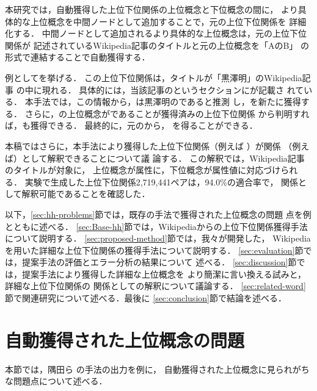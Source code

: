 \documentclass[japanese]{jnlp_1.4}
\newcommand{\xmp}[1]{}
\newcommand{\isa}[2]{}
\newcommand{\isaFour}[4]{}
\newcommand{\attval}[3]{}
\begin{document}
本研究では，自動獲得した上位下位関係の上位概念と下位概念の間に，
より具体的な上位概念を中間ノードとして追加することで，元の上位下位関係を
詳細化する．
中間ノードとして追加されるより具体的な上位概念は，元の上位下位関係が
記述されているWikipedia記事のタイトルと元の上位概念を「AのB」
の形式で連結することで自動獲得する．

例として\isa{作品}{七人の侍}を挙げる．
この上位下位関係は，タイトルが「黒澤明」のWikipedia記事
の中に現れる．
具体的には，当該記事の\xmp{作品}というセクションに\xmp{七人の侍}が記載さ
れている．
本手法では，この情報から，\xmp{七人の侍}は黒澤明の\xmp{作品}であると推測
し，\isa{黒澤明の作品}{七人の侍}を新たに獲得する．
さらに，\xmp{黒澤明}の上位概念が\xmp{映画監督}であることが獲得済みの上位下位関係
から判明すれば，\isa{映画監督の作品}{七人の侍}も獲得できる．
最終的に，元の\isa{作品}{七人の侍}から，
\isaFour{作品}{映画監督の作品}{黒澤明の作品}{七人の侍}を得ることができる．


本稿ではさらに，本手法により獲得した上位下位関係（例えば
\isa{黒澤明の作品}{七人の侍}）が\attval{対象}{属性}{属性値}関係
（例えば\attval{黒澤明}{作品}{七人の侍}）として解釈できることについて議
論する．
この解釈では，Wikipedia記事のタイトルが対象に，
上位概念が属性に，下位概念が属性値に対応づけられる．
実験で生成した上位下位関係2,719,441ペアは，94.0\%の適合率で，
\attval{対象}{属性}{属性値}関係として解釈可能であることを確認した．

以下，\ref{sec:hh-problems}節では，既存の手法で獲得された上位概念の問題
点を例とともに述べる．
\ref{sec:Base-hh}節では，Wikipediaからの上位下位関係獲得手法\cite{隅田:吉永:鳥澤:2009}について説明する．
\ref{sec:proposed-method}節では，我々が開発した，
Wikipediaを用いた詳細な上位下位関係の獲得手法について説明する．
\ref{sec:evaluation}節では，提案手法の評価とエラー分析の結果について
述べる．
\ref{sec:discussion}節では，提案手法により獲得した詳細な上位概念を
より簡潔に言い換える試みと，詳細な上位下位関係の
\attval{対象}{属性}{属性値}関係としての解釈について議論する．
\ref{sec:related-word}節で関連研究について述べる．最後に
\ref{sec:conclusion}節で結論を述べる．



\section{自動獲得された上位概念の問題 \label{sec:hh-problems}}

本節では，隅田ら \cite{隅田:吉永:鳥澤:2009}の手法の出力を例に，
自動獲得された上位概念に見られがちな問題点について述べる．
\end{document}

